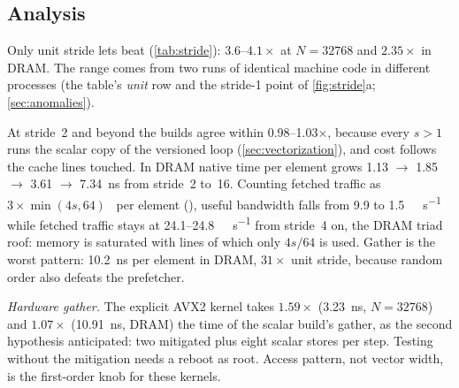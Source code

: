 \begin{table}[tbp]
  \centering\small
  \caption{Time per processed element (ns) by access pattern. \emph{AVX2 gather} is the explicit
   kernel (native build only); speedup is scalar over the faster native
  kernel (the AVX2 gather has no strided form, hence --).}\label{tab:stride}
\end{table}

\subsection{Analysis}
Only unit stride lets  beat  (\cref{tab:stride}): $3.6\text{--}4.1\times$
at $N=\num{32768}$ and $2.35\times$ in DRAM. The range comes from two runs of identical machine
code in different processes (the table's \emph{unit} row and the stride-1 point of
\cref{fig:stride}a; \cref{sec:anomalies}).

At stride~2 and beyond the builds agree within \numrange{0.98}{1.03}$\times$, because every $s>1$
runs the scalar copy of the versioned loop (\cref{sec:vectorization}), and cost follows the cache
lines touched. In DRAM native time per element grows \num{1.13} $\to$ \num{1.85} $\to$ \num{3.61}
$\to$ \qty{7.34}{\nano\second} from stride~2 to~16. Counting fetched traffic as
$3\times\min(4s,64)$~\unit{\byte} per element (), useful bandwidth falls from
\num{9.9} to \qty{1.5}{\gibi\byte\per\second} while fetched traffic stays at
\numrange{24.1}{24.8}~\unit{\gibi\byte\per\second} from stride~4 on, the DRAM triad roof: memory is
saturated with lines of which only $4s/64$ is used. Gather is the worst pattern:
\qty{10.2}{\nano\second} per element in DRAM, $31\times$ unit stride, because random order also
defeats the prefetcher.

\emph{Hardware gather.} The explicit AVX2 kernel takes $1.59\times$ (\qty{3.23}{\nano\second},
$N=\num{32768}$) and $1.07\times$ (\qty{10.91}{\nano\second}, DRAM) the time of the scalar build's
gather, as the second hypothesis anticipated: two mitigated  plus eight scalar
stores per step. Testing without the mitigation needs a reboot as root. Access pattern, not vector
width, is the first-order knob for these kernels.

